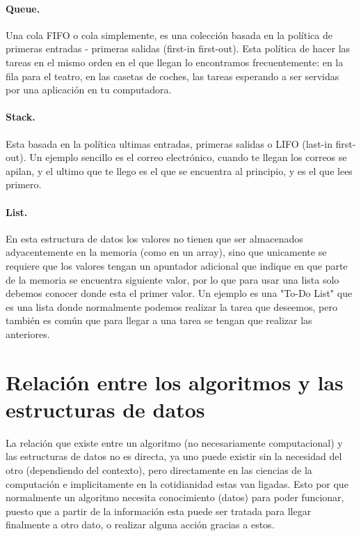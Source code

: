 \documentclass[spanish,12pt,letterpapper]{article}
\begin{document}
	\paragraph{Queue.}
	Una cola FIFO o cola simplemente, es una colecci\'on basada en la pol\'itica de primeras entradas - primeras salidas (first-in first-out). Esta pol\'itica de hacer las tareas en el mismo orden en el que llegan lo encontramos frecuentemente: en la fila para el teatro, en las casetas de coches, las tareas esperando a ser servidas por una aplicaci\'on en tu computadora.
	
	\paragraph{Stack.}
	Esta basada en la pol\'itica ultimas entradas, primeras salidas o LIFO (last-in first-out). Un ejemplo sencillo es el correo electr\'onico, cuando te llegan los correos se apilan, y el ultimo que te llego es el que se encuentra al principio, y es el que lees primero.
	
	\paragraph{List.}
	En esta estructura de datos los valores no tienen que ser almacenados adyacentemente en la memoria (como en un array), sino que unicamente se requiere que los valores tengan un apuntador adicional que indique en que parte de la memoria se encuentra siguiente valor, por lo que para usar una lista solo debemos conocer donde esta el primer valor. Un ejemplo es una "To-Do List" que es una lista donde normalmente podemos realizar la tarea que deseemos, pero tambi\'en es com\'un que para llegar a una tarea se tengan que realizar las anteriores. 
	
	\pagebreak
	
	\section{Relaci\'on entre los algoritmos y las estructuras de datos \\[1cm]}
	La relaci\'on que existe entre un algoritmo (no necesariamente computacional) y las estructuras de datos no es directa, ya uno puede existir sin la necesidad del otro (dependiendo del contexto), pero directamente en las ciencias de la computaci\'on e implicitamente en la cotidianidad estas van ligadas. Esto por que normalmente un algoritmo necesita conocimiento (datos) para poder funcionar, puesto que a partir de la informaci\'on esta puede ser tratada para llegar finalmente a otro dato, o realizar alguna acci\'on gracias a estos. \\
	
\end{document}
